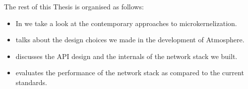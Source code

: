 The rest of this Thesis is organised as follows: 

\begin{itemize}
    \item{In  we take a look at the contemporary approaches to microkernelization. }
    \item{ talks about the design choices we made in the development of Atmosphere.}
    \item{ discusses the API design and the internals of the network stack we built.  }
    \item{ evaluates the performance of the network stack as compared to the current standards.}
\end{itemize}
